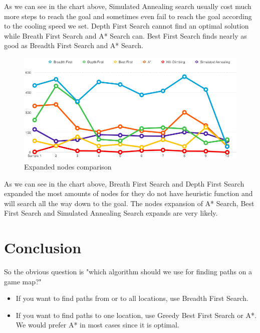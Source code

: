 \documentclass[a4paper]{article}
\begin{document}
\noindent As we can see in the chart above, Simulated Annealing search usually cost much more steps to reach the goal and sometimes even fail to reach the goal according to the cooling speed we set. Depth First Search cannot find an optimal solution while Breath First Search and A* Search can. Best First Search finds nearly as good as Breadth First Search and A* Search. \\

\begin{figure}[h!]
  \centering
    \includegraphics[scale=.4]{images/expanded_node.png}
  \caption{Expanded nodes comparison}
\end{figure}

\noindent As we can see in the chart above, Breath First Search and Depth First Search expanded the most amounts of nodes for they do not have heuristic function and will search all the way down to the goal.  The nodes expansion of A* Search, Best First Search and Simulated Annealing Search expands are very likely. \\




\section{Conclusion}

So the obvious question is "which algorithm should we use for finding paths on a game map?"

\begin{itemize}
\item If you want to find paths from or to all locations, use Breadth First Search.
\item If you want to find paths to one location, use Greedy Best First Search or A*. We would prefer A* in most cases since it is optimal.
\end{itemize}
\end{document}
